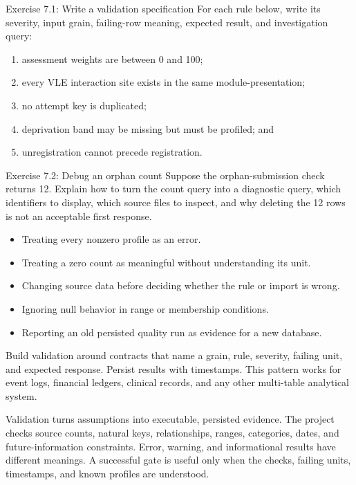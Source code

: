 \begin{exercisebox}{Exercise 7.1: Write a validation specification}
For each rule below, write its severity, input grain, failing-row meaning,
expected result, and investigation query:
\begin{enumerate}
  \item assessment weights are between 0 and 100;
  \item every VLE interaction site exists in the same module-presentation;
  \item no attempt key is duplicated;
  \item deprivation band may be missing but must be profiled; and
  \item unregistration cannot precede registration.
\end{enumerate}
\end{exercisebox}

\begin{exercisebox}{Exercise 7.2: Debug an orphan count}
Suppose the orphan-submission check returns 12. Explain how to turn the count
query into a diagnostic query, which identifiers to display, which source files
to inspect, and why deleting the 12 rows is not an acceptable first response.
\end{exercisebox}

\begin{commonmistakes}
\begin{itemize}
  \item Treating every nonzero profile as an error.
  \item Treating a zero count as meaningful without understanding its unit.
  \item Changing source data before deciding whether the rule or import is
    wrong.
  \item Ignoring null behavior in range or membership conditions.
  \item Reporting an old persisted quality run as evidence for a new database.
\end{itemize}
\end{commonmistakes}

\transferheading
Build validation around contracts that name a grain, rule, severity, failing
unit, and expected response. Persist results with timestamps. This pattern
works for event logs, financial ledgers, clinical records, and any other
multi-table analytical system.

\begin{summarybox}
Validation turns assumptions into executable, persisted evidence. The project
checks source counts, natural keys, relationships, ranges, categories, dates,
and future-information constraints. Error, warning, and informational results
have different meanings. A successful gate is useful only when the checks,
failing units, timestamps, and known profiles are understood.
\end{summarybox}
